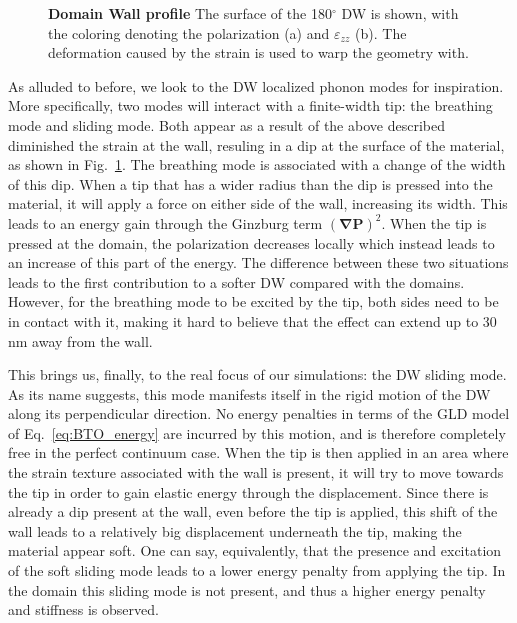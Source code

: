 \begin{figure}[h]
	\caption{\label{fig:BTO_wall} {\bf Domain Wall profile} The surface of the 180$^\circ$ DW is shown, with the coloring denoting the polarization (a) and $\varepsilon_{zz}$ (b). The deformation caused by the strain is used to warp the geometry with.}
\end{figure}
As alluded to before, we look to the DW localized phonon modes for inspiration.
More specifically, two modes will interact with a finite-width tip: the breathing mode and sliding mode.
Both appear as a result of the above described diminished the strain at the wall, resuling in a dip at the surface of the material, as shown in Fig.~\ref{fig:BTO_wall}.
The breathing mode is associated with a change of the width of this dip.
When a tip that has a wider radius than the dip is pressed into the material, it will apply a force on either side of the wall, increasing its width.
This leads to an energy gain through the Ginzburg term $(\bm{\nabla}\bm{P})^2$.
When the tip is pressed at the domain, the polarization decreases locally which instead leads to an increase of this part of the energy.
The difference between these two situations leads to the first contribution to a softer DW compared with the domains.
However, for the breathing mode to be excited by the tip, both sides need to be in contact with it, making it hard to believe that the effect can extend up to 30 nm away from the wall. 

This brings us, finally, to the real focus of our simulations: the DW sliding mode.
As its name suggests, this mode manifests itself in the rigid motion of the DW along its perpendicular direction.
No energy penalties in terms of the GLD model of Eq.~\ref{eq:BTO_energy} are incurred by this motion, and is therefore completely free in the perfect continuum case.
When the tip is then applied in an area where the strain texture associated with the wall is present, it will try to move towards the tip in order to gain elastic energy through the displacement.
Since there is already a dip present at the wall, even before the tip is applied, this shift of the wall leads to a relatively big displacement underneath the tip, making the material appear soft.
One can say, equivalently, that the presence and excitation of the soft sliding mode leads to a lower energy penalty from applying the tip.
In the domain this sliding mode is not present, and thus a higher energy penalty and stiffness is observed.

